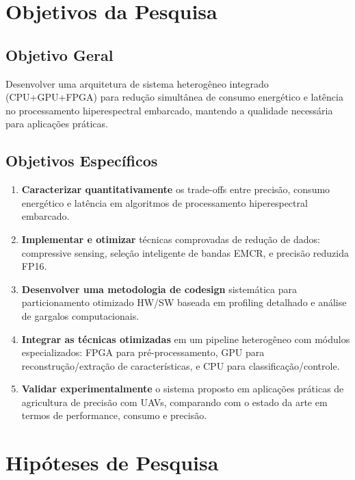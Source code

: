 \section{Objetivos da Pesquisa}

\subsection{Objetivo Geral}

Desenvolver uma arquitetura de sistema heterogêneo integrado (CPU+GPU+FPGA) para redução simultânea de consumo energético e latência no processamento hiperespectral embarcado, mantendo a qualidade necessária para aplicações práticas.

\subsection{Objetivos Específicos}

\begin{enumerate}
\item \textbf{Caracterizar quantitativamente} os trade-offs entre precisão, consumo energético e latência em algoritmos de processamento hiperespectral embarcado.

\item \textbf{Implementar e otimizar} técnicas comprovadas de redução de dados: compressive sensing, seleção inteligente de bandas EMCR, e precisão reduzida FP16.

\item \textbf{Desenvolver uma metodologia de codesign} sistemática para particionamento otimizado HW/SW baseada em profiling detalhado e análise de gargalos computacionais.

\item \textbf{Integrar as técnicas otimizadas} em um pipeline heterogêneo com módulos especializados: FPGA para pré-processamento, GPU para reconstrução/extração de características, e CPU para classificação/controle.

\item \textbf{Validar experimentalmente} o sistema proposto em aplicações práticas de agricultura de precisão com UAVs, comparando com o estado da arte em termos de performance, consumo e precisão.
\end{enumerate}

\section{Hipóteses de Pesquisa}

